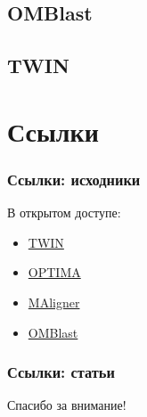 \documentclass{beamer}
\begin{document}
\subsection{OMBlast}


\subsection{TWIN}


\section{Ссылки}
\begin{frame}
\frametitle{Ссылки: исходники}
В открытом доступе:
\begin{itemize}
  \item \href{http://www.cs.colostate.edu/twin/download.html}{TWIN}
  \item \href{https://github.com/verznet/OPTIMA}{OPTIMA}
  \item \href{https://github.com/LeeMendelowitz/maligner}{MAligner}
  \item \href{https://github.com/aldenleung/OMBlast}{OMBlast}
\end{itemize}
\end{frame}

\begin{frame}[t,allowframebreaks]
\frametitle{Ссылки: статьи}
\printbibliography
\end{frame}

\begin{frame}

\begin{center}
\Huge Спасибо за внимание!
\end{center}

\end{frame}
\end{document}
